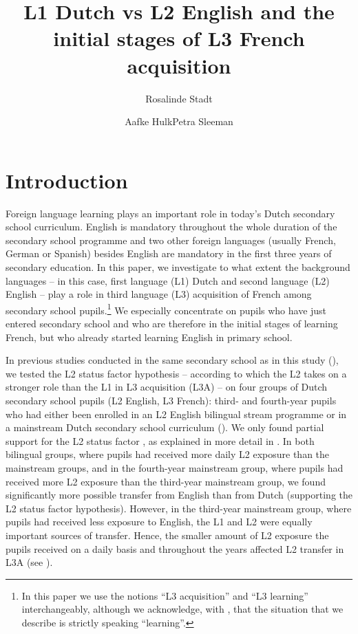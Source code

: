 \documentclass[output=paper]{langsci/langscibook}
\author{Rosalinde Stadt\affiliation{University of Amsterdam}\and Aafke Hulk\affiliation{University of Amsterdam}\lastand Petra Sleeman\affiliation{University of Amsterdam}}
\title{L1 Dutch vs L2 English and the initial stages of L3 French acquisition}
\begin{document}
\maketitle
\section{Introduction}%
\label{sec:stadt:1}\largerpage

Foreign language learning plays an important role in today's Dutch secondary school curriculum. English is mandatory throughout the whole duration of the secondary school programme and two other foreign languages (usually French, German or Spanish) besides English are mandatory in the first three years of secondary education. In this paper, we investigate to what extent the background languages – in this case, first language (L1) Dutch and second language (L2) English – play a role in third language (L3) acquisition of French among secondary school pupils.\footnote{In this paper we use the notions ``L3 acquisition'' and ``L3 learning'' interchangeably, although we acknowledge, with \citet[fn 1, p.61]{BardelFalk2012}, that the situation that we describe is strictly speaking ``learning''.} We especially concentrate on pupils who have just entered secondary school and who are therefore in the initial stages of learning French, but who already started learning English in primary school.

In previous studies conducted in the same secondary school as in this study (\citealt{StadtEtAl2016, StadtEtAl2018Exposure}), we tested the L2 status factor hypothesis – according to which the L2 takes on a stronger role than the L1 in L3 acquisition (L3A) – on four groups of Dutch secondary school pupils (L2 English, L3 French): third- and fourth-year pupils who had either been enrolled in an L2 English bilingual stream programme or in a mainstream Dutch secondary school curriculum (\citealt{StadtEtAl2016, StadtEtAl2018Exposure}). We only found partial support for the L2 status factor \citep{BardelFalk2007, FalkBardel2011}, as explained in more detail in . In both bilingual groups, where pupils had received more daily L2 exposure than the mainstream groups, and in the fourth-year mainstream group, where pupils had received more L2 exposure than the third-year mainstream group, we found significantly more possible transfer from English than from Dutch (supporting the L2 status factor hypothesis). However, in the third-year mainstream group, where pupils had received less exposure to English, the L1 and L2 were equally important sources of transfer. Hence, the smaller amount of L2 exposure the pupils received on a daily basis and throughout the years affected L2 transfer in L3A (see \citealt{Hammarberg2001, Hammarberg2009, Tremblay2006}).
\end{document}
